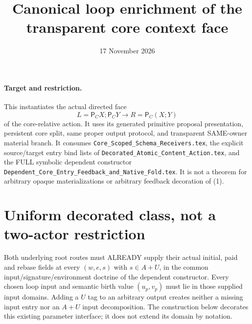 \documentclass[11pt]{article}
\title{Canonical loop enrichment of the transparent core context face}
\date{17 November 2026}
\begin{document}
\maketitle
\paragraph{Target and restriction.}
This instantiates the actual directed face
\[
 L=\mathsf P_CX;\mathsf P_CY\longrightarrow
 R=\mathsf P_C(X;Y)                                      \tag{1}
\]
of the core-relative action. It uses its generated primitive proposal presentation, persistent core split, same proper output protocol, and transparent SAME-owner material branch. It consumes \texttt{Core\_Scoped\_Schema\_Receivers.tex}, the explicit source/target entry bind lists of \texttt{Decorated\_Atomic\_Content\_Action.tex}, and the FULL symbolic dependent constructor \texttt{Dependent\_Core\_Entry\_Feedback\_and\_Native\_Fold.tex}. It is not a theorem for arbitrary opaque materializations or arbitrary feedback decoration of (1).

\section{Uniform decorated class, not a two-actor restriction}
Both underlying root routes must ALREADY supply their actual initial, paid and rebase fields at every $(w,e,s)$ with $s\in A+U$, in the common input/signature/environment doctrine of the dependent constructor. Every chosen loop input and semantic birth value $(u_p,v_p)$ must lie in those supplied input domains. Adding a $U$ tag to an arbitrary output creates neither a missing input entry nor an $A+U$ input decomposition. The construction below decorates this existing parameter interface; it does not extend its domain by notation.
\end{document}
